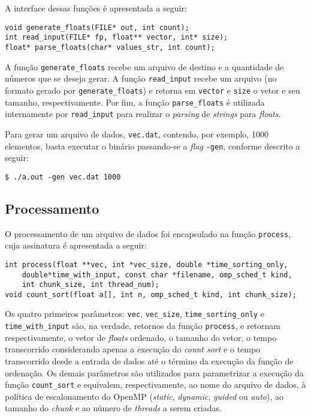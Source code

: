 \documentclass[12pt,a4paper]{article}
\begin{document}
A interface dessas funções é apresentada a seguir:

\begin{verbatim}
void generate_floats(FILE* out, int count);
int read_input(FILE* fp, float** vector, int* size);
float* parse_floats(char* values_str, int count);
\end{verbatim}

A função \texttt{generate\_floats} recebe um arquivo de destino e a quantidade de
números que se deseja gerar. A função \texttt{read\_input} recebe um arquivo (no
formato gerado por \texttt{generate\_floats}) e retorna em \texttt{vector} e
\texttt{size} o vetor e seu tamanho, respectivamente. Por fim, a função
\texttt{parse\_floats} é utilizada internamente por \texttt{read\_input} para
realizar o \textit{parsing} de \textit{strings} para \textit{floats}.

Para gerar um arquivo de dados, \texttt{vec.dat}, contendo, por exemplo, 1000
elementos, basta executar o binário passando-se a \textit{flag} \texttt{-gen},
conforme descrito a seguir:

\begin{verbatim}
$ ./a.out -gen vec.dat 1000
\end{verbatim}

\subsection{Processamento}
O processamento de um arquivo de dados foi encapsulado na função
\texttt{process}, cuja assinatura é apresentada a seguir:

\begin{verbatim}
int process(float **vec, int *vec_size, double *time_sorting_only,
    double*time_with_input, const char *filename, omp_sched_t kind,
    int chunk_size, int thread_num);
void count_sort(float a[], int n, omp_sched_t kind, int chunk_size);
\end{verbatim}

Os quatro primeiros parâmetros: \texttt{vec}, \texttt{vec\_size},
\texttt{time\_sorting\_only} e \texttt{time\_with\_input} são, na verdade, retornos
da função \texttt{process}, e retornam respectivamente, o vetor de
\textit{floats} ordenado, o tamanho do vetor, o tempo transcorrido considerando
apenas a execução do \textit{count sort} e o tempo transcorrido desde a entrada
de dados até o término da execução da função de ordenação. Os demais parâmetros
são utilizados para parametrizar a execução da função \texttt{count\_sort} e
equivalem, respectivamente, ao nome do arquivo de dados, à política de
escalonamento do OpenMP (\textit{static}, \textit{dynamic}, \textit{guided} ou
\textit{auto}), ao tamanho do \textit{chunk} e ao número de \textit{threads} a
serem criadas.
\end{document}
